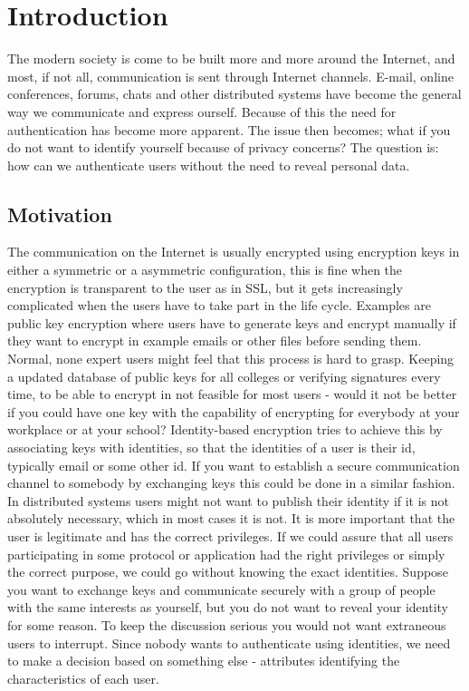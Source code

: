 \chapter{Introduction}
\label{chp:intro} 
The modern society is come to be built more and more around the Internet, and most, if not all, communication is sent through Internet channels. E-mail, online conferences, forums, chats and other distributed systems have become the general way we communicate and express ourself. Because of this the need for authentication has become more apparent. The issue then becomes; what if you do not want to identify yourself because of privacy concerns? The question is: how can we authenticate users without the need to reveal personal data.

\section{Motivation}
The communication on the Internet is usually encrypted using encryption keys in either a symmetric or a asymmetric configuration, this is fine when the encryption is transparent to the user as in SSL, but it gets increasingly complicated when the users have to take part in the life cycle. Examples are public key encryption where users have to generate keys and encrypt manually if they want to encrypt in example emails or other files before sending them. Normal, none expert users might feel that this process is hard to grasp. Keeping a updated database of public keys for all colleges or verifying signatures every time, to be able to encrypt in not feasible for most users - would it not be better if you could have one key with the capability of encrypting for everybody at your workplace or at your school? Identity-based encryption tries to achieve this by associating keys with identities, so that the identities of a user is their id, typically email or some other id. If you want to establish a secure communication channel to somebody by exchanging keys this could be done in a similar fashion.
In distributed systems users might not want to publish their identity if it is not absolutely necessary, which in most cases it is not. It is more important that the user is legitimate and has the correct privileges. If we could assure that all users participating in some protocol or application had the right privileges or simply the correct purpose, we could go without knowing the exact identities. Suppose you want to exchange keys and communicate securely with a group of people with the same interests as yourself, but you do not want to reveal your identity for some reason. To keep the discussion serious you would not want extraneous users to interrupt. Since nobody wants to authenticate using identities, we need to make a decision based on something else - attributes identifying the characteristics of each user. 

